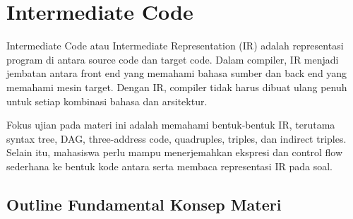 \section{Intermediate Code}

Intermediate Code atau Intermediate Representation (IR) adalah representasi program di antara source code dan target code. Dalam compiler, IR menjadi jembatan antara front end yang memahami bahasa sumber dan back end yang memahami mesin target. Dengan IR, compiler tidak harus dibuat ulang penuh untuk setiap kombinasi bahasa dan arsitektur.

Fokus ujian pada materi ini adalah memahami bentuk-bentuk IR, terutama syntax tree, DAG, three-address code, quadruples, triples, dan indirect triples. Selain itu, mahasiswa perlu mampu menerjemahkan ekspresi dan control flow sederhana ke bentuk kode antara serta membaca representasi IR pada soal.

\subsection{Outline Fundamental Konsep Materi}

